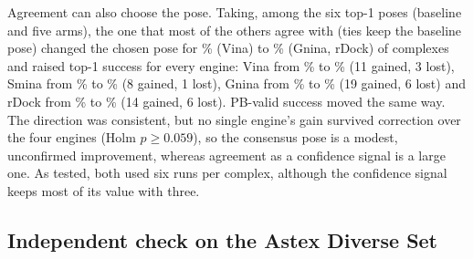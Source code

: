 Agreement can also choose the pose. Taking, among the six top-1 poses (baseline and five
arms), the one that most of the others agree with (ties keep the baseline pose) changed the
chosen pose for \% (Vina) to \% (Gnina, rDock) of complexes and raised top-1 success
for every engine: Vina from \% to \% (11 gained, 3 lost), Smina from \% to
\% (8 gained, 1 lost), Gnina from \% to \% (19 gained, 6 lost) and rDock from
\% to \% (14 gained, 6 lost). PB-valid success moved the same way. The direction was
consistent, but no single engine's gain survived correction over the four engines (Holm
$p \ge 0.059$), so the consensus pose is a modest, unconfirmed improvement, whereas
agreement as a confidence signal is a large one. As tested, both used six runs per complex,
although the confidence signal keeps most of its value with three.

\subsection{Independent check on the Astex Diverse Set}
\label{sec:astex}

